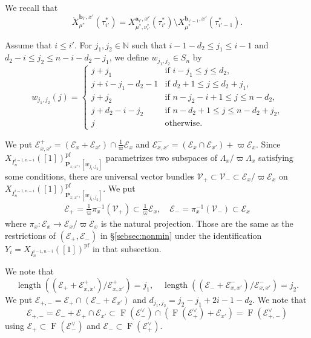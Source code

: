 \documentclass[12pt,a4paper]{article}
\DeclareMathOperator{\length}{length}
\DeclareMathOperator{\oF}{F}
\newcommand{\bN}{\mathbb{N}}
\newcommand{\bfP}{\mathbf{P}}
\newcommand{\bfa}{\mathbf{a}}
\newcommand{\bfb}{\mathbf{b}}
\newcommand{\cE}{\mathcal{E}}
\newcommand{\cV}{\mathcal{V}}
\newcommand{\pf}{\mathrm{pf}}
\begin{document}
We recall that 
\[
 \mathring{X}_{\mu^*}^{\bfb_{i'},x'}(\tau_{i'}^*)=
 X_{\mu^*,\nu_{i'}^*}^{\bfa_{i'},x'}(\tau_{i'}^*) \setminus X_{\mu^*}^{\bfb_{i'-1},x'}(\tau_{i'-1}^*). 
\]

Assume that $i \leq i'$. 
For $j_1,j_2 \in \bN$ such that 
$i-1-d_2 \leq j_1 \leq i-1$ and 
$d_2 -i \leq j_2 \leq n-i-d_2 -j_1$, 
we define $w_{j_1,j_2} \in S_n$ by 
\[
 w_{j_1,j_2} (j)= 
 \begin{cases}
 j+j_1 & \textrm{if $i-j_1 \leq j \leq d_2$,}\\ 
 j+i-j_1-d_2 -1 & \textrm{if $d_2 +1 \leq j \leq d_2 +j_1$,}\\ 
 j+j_2 & \textrm{if $n-j_2-i+1 \leq j \leq n-d_2$,}\\ 
 j+d_2 -i-j_2 & \textrm{if $n-d_2 +1 \leq j \leq n-d_2 +j_2$,}\\ 
 j & \textrm{otherwise.} 
 \end{cases}
\]

We put 
$\cE_{x,x'}^+=(\cE_x + \cE_{x'}) \cap \frac{1}{\varpi} \cE_x$ 
and 
$\cE_{x,x'}^-=(\cE_x \cap \cE_{x'})+\varpi \cE_x$. 
Since $X_{I_{n}^{i-1,n-i}}([1])_{\bfP_{x,x'},[w_{j_1,j_2}]}^{\pf}$ parametrizes two subspaces of $\Lambda_x /\varpi \Lambda_x$ satisfying some conditions, there are universal vector bundles $\cV_{+} \subset \cV_- \subset \cE_x /\varpi \cE_x$ on $X_{I_{n}^{i-1,n-i}}([1])_{\bfP_{x,x'},[w_{j_1,j_2}]}^{\pf}$. 
We put 
\begin{align*}
    \cE_+ = \frac{1}{\varpi} \pi_x^{-1} (\cV_+) \subset \frac{1}{\varpi} \cE_x, \quad 
    \cE_- = \pi_x^{-1} (\cV_-) \subset \cE_x 
\end{align*}
where $\pi_x \colon \cE_x \to \cE_x /\varpi \cE_x$ is the natural projection. 
Those are the same as the restrictions of $(\cE_+,\cE_-)$ in \S \ref{sebsec:nonmin} under the identification $Y_i=X_{I_{n}^{i-1,n-i}}([1])^{\mathrm{pf}}$ in that subsection. 

We note that 
\[
 \length ((\cE_+ +\cE_{x,x'}^+ )/ \cE_{x,x'}^+ )=j_1, \quad \length ((\cE_- +\cE_{x,x'}^- )/\cE_{x,x'}^- )=j_2. 
\]
We put $\cE_{+,-} =\cE_+ \cap (\cE_- +\cE_{x'})$ and $d_{j_1,j_2}=j_2 -j_1 +2i-1-d_2$. 
We note that 
\begin{equation}\label{eq:incE+-}
 \cE_{+,-}=\cE_- + \cE_+ \cap \cE_{x'} \subset 
 \oF (\cE_-^{\vee}) \cap (\oF (\cE_+^{\vee}) + \cE_{x'}) 
 =\oF (\cE_{+,-}^{\vee}) 
\end{equation}
using 
$\cE_+ \subset \oF (\cE_-^{\vee})$ 
and 
$\cE_- \subset \oF (\cE_+^{\vee})$. 
\end{document}
